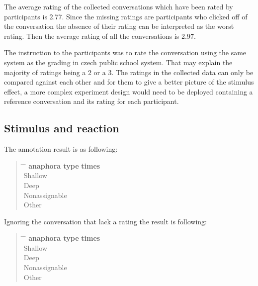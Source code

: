 The average rating of the collected conversations
which have been rated by participants is 2.77.
Since the missing ratings are participants who clicked off of the conversation
the absence of their rating can be interpreted as the worst rating.
Then the average rating of all the conversations is 2.97.

The instruction to the participants was to rate the conversation
using the same system as the grading in czech public school system.
That may explain the majority of ratings being a 2 or a 3.
The ratings in the collected data can only be compared against each other and
for them to give a better picture of the stimulus effect,
a more complex experiment design would need to be deployed
containing a reference conversation and its rating for each participant.

\subsection{Stimulus and reaction}

The annotation result is as following:

\begin{quote}
\begin{tabbing}
\hspace{4cm} \= \hspace{4cm} \= \kill %
\textbf{anaphora type} \> \textbf{times} \\
Shallow  \\
Deep  \\
Nonassignable  \\
Other 
\end{tabbing}
\end{quote}

Ignoring the conversation that lack a rating the result is following:

\begin{quote}
\begin{tabbing}
\hspace{4cm} \= \hspace{4cm} \= \kill %
\textbf{anaphora type} \> \textbf{times} \\
Shallow  \\
Deep  \\
Nonassignable  \\
Other 
\end{tabbing}
\end{quote}

